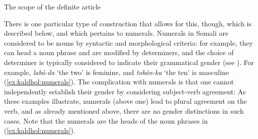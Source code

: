 \documentclass[output=paper]{langscibook}
\begin{document}
\ea\label{ex:kaldhol:defscope}
	The scope of the definite article
		\begin{xlist}
		\end{xlist}
\z
There is one particular type of construction that allows for this, though, which is described below, and which pertains to numerals. Numerals in Somali are considered to be nouns by syntactic and morphological criteria: for example, they can head a noun phrase and are modified by determiners, and the choice of determiner is typically considered to indicate their grammatical gender (see \citealt[69--72]{Saeed1999a}). For example, \textit{labá-da} `the two' is feminine, and \textit{tobán-ka} `the ten' is masculine (\ref{ex:kaldhol:numerals}). The complication with numerals is that one cannot independently establish their gender by considering subject-verb agreement: As these examples illustrate, numerals (above one) lead to plural agreement on the verb, and as already mentioned above, there are no gender distinctions in such cases. Note that the numerals are the heads of the noun phrases in (\ref{ex:kaldhol:numerals}).
\end{document}
